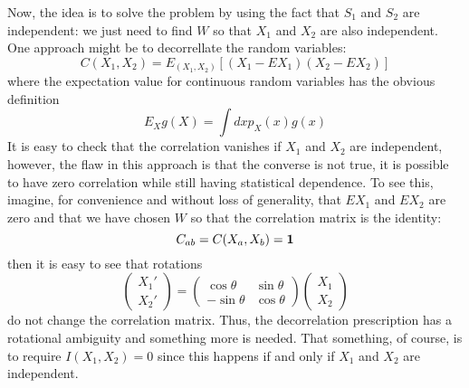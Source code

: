 \documentclass[12pt]{article}
\begin{document}
Now, the idea is to solve the problem by using the fact that $S_1$ and $S_2$ are independent: we just need to find $W$ so that $X_1$ and $X_2$ are also independent. One approach might be to decorrellate the random variables:
\begin{equation}
C(X_1,X_2)=E_{(X_1,X_2)}[(X_1-EX_1)(X_2-EX_2)]
\end{equation}
where the expectation value for continuous random variables has the obvious definition
\begin{equation}
E_X g(X)=\int dx p_X(x)g(x)
\end{equation}
It is easy to check that the correlation vanishes if $X_1$ and $X_2$ are independent, however, the flaw in this approach is that the converse is not true, it is possible to have zero correlation while still having statistical dependence. To see this, imagine, for convenience and without loss of generality, that $EX_1$ and $EX_2$ are zero and that we have chosen $W$ so that the correlation matrix is the identity:
\begin{equation}
C_{ab}=C(X_a,X_b)={\bf 1}
\end{equation}
then it is easy to see that rotations
\begin{equation}
\left(\begin{array}{c}X_1'\\X_2'\end{array}\right)=\left(\begin{array}{cc}\cos{\theta}&\sin{\theta}\\-\sin{\theta}&\cos{\theta}\end{array}\right)\left(\begin{array}{c}X_1\\X_2\end{array}\right)
\end{equation}
do not change the correlation matrix. Thus, the decorrelation
prescription has a rotational ambiguity and something more is
needed. That something, of course, is to require $I(X_1,X_2)=0$ since
this happens if and only if $X_1$ and $X_2$ are independent.
\end{document}
